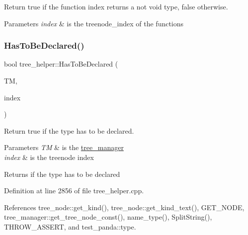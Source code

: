 Return true if the function index returns a not void type, false otherwise. 


\begin{DoxyParams}{Parameters}
{\em index} & is the treenode\+\_\+index of the functions \\
\hline
\end{DoxyParams}
\mbox{\label{classtree__helper_af222b2ac92c27b68a6b18308f200d0c8}} 
\subsubsection{\texorpdfstring{Has\+To\+Be\+Declared()}{HasToBeDeclared()}}
{\footnotesize\ttfamily bool tree\+\_\+helper\+::\+Has\+To\+Be\+Declared (\begin{DoxyParamCaption}\item[{const \hyperlink{tree__manager_8hpp_a792e3f1f892d7d997a8d8a4a12e39346}{tree\+\_\+manager\+Const\+Ref} \&}]{TM,  }\item[{const unsigned int}]{index }\end{DoxyParamCaption})\hspace{0.3cm}{\ttfamily [static]}}



Return true if the type has to be declared. 


\begin{DoxyParams}{Parameters}
{\em TM} & is the \hyperlink{classtree__manager}{tree\+\_\+manager} \\
\hline
{\em index} & is the treenode index \\
\hline
\end{DoxyParams}
\begin{DoxyReturn}{Returns}
if the type has to be declared 
\end{DoxyReturn}


Definition at line 2856 of file tree\+\_\+helper.\+cpp.



References tree\+\_\+node\+::get\+\_\+kind(), tree\+\_\+node\+::get\+\_\+kind\+\_\+text(), G\+E\+T\+\_\+\+N\+O\+DE, tree\+\_\+manager\+::get\+\_\+tree\+\_\+node\+\_\+const(), name\+\_\+type(), Split\+String(), T\+H\+R\+O\+W\+\_\+\+A\+S\+S\+E\+RT, and test\+\_\+panda\+::type.



